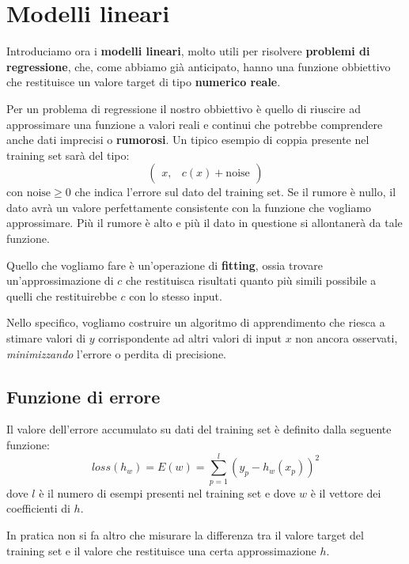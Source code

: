 \chapter{Modelli lineari}
Introduciamo ora i \textbf{modelli lineari}, molto utili per 
risolvere \textbf{problemi di regressione}, che, come abbiamo 
gi\`a anticipato, hanno una funzione obbiettivo che restituisce
un valore target di tipo \textbf{numerico reale}.

Per un problema di regressione il nostro obbiettivo \`e quello 
di riuscire ad approssimare una funzione a valori reali e
continui che potrebbe comprendere anche dati imprecisi o
\textbf{rumorosi}. Un tipico esempio di coppia presente nel 
training set sar\`a del tipo:
\[ \begin{pmatrix} x, &  c(x) + \text{noise} \end{pmatrix} \]
con $\text{noise} \geq 0$ che indica l'errore sul dato del 
training set. Se il rumore \`e nullo, il dato avr\`a un valore 
perfettamente consistente con la funzione che vogliamo
approssimare. Pi\`u il rumore \`e alto e pi\`u il dato in 
questione si allontaner\`a da tale funzione.

Quello che vogliamo fare \`e un'operazione di \textbf{fitting}, 
ossia trovare un'approssimazione di $c$ che restituisca 
risultati quanto pi\`u simili possibile a quelli che 
restituirebbe $c$ con lo stesso input.

Nello specifico, vogliamo costruire un algoritmo di 
apprendimento che riesca a stimare valori di $y$ corrispondente
ad altri valori di input $x$ non ancora osservati, 
\emph{minimizzando} l'errore o perdita di precisione.

\section{Funzione di errore}
Il valore dell'errore accumulato su dati del training set \`e
definito dalla seguente funzione:
\[ loss(h_w) = E(w) = \sum_{p=1}^l (y_p - h_w(x_p))^2 \]
dove $l$ \`e il numero di esempi presenti nel training set e 
dove $w$ \`e il vettore dei coefficienti di $h$.

In pratica non si fa altro che misurare la differenza tra il
valore target del training set e il valore che restituisce una 
certa approssimazione $h$.

